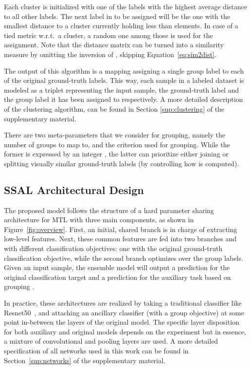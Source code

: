 \documentclass[10pt,twocolumn,letterpaper]{article}
\begin{document}
Each cluster is initialized with one of the  labels with the highest average distance to all other labels.
The next label in  to be assigned will be the one with the smallest distance to a cluster currently holding less than  elements.
In case of a tied metric w.r.t.~a cluster, a random one among those is used for the assignment.
Note that the distance matrix  can be turned into a similarity measure by omitting the inversion of  \ie, skipping Equation~\ref{eq:sim2dist}.

The output of this algorithm is a mapping  assigning a single group label to each of the original ground-truth labels.
This way, each sample in a labeled dataset is modeled as a triplet  representing the input sample, the ground-truth label and the group label it has been assigned to respectively.
A more detailed description of the clustering algorithm, can be found in Section \ref{sup:clustering} of the supplementary material.

There are two meta-parameters that we consider for grouping, namely the number of groups to map to, and the criterion used for grouping.
While the former is expressed by an integer , the latter can prioritize either joining or splitting visually similar ground-truth labels (by controlling how  is computed).


\subsection{SSAL Architectural Design}
The proposed model follows the structure of a hard parameter sharing architecture for MTL with three main components, as shown in Figure~\ref{fig:overview}.
First, an initial, shared branch  is in charge of extracting low-level features.
Next, these common features are fed into two branches  and  with different classification objectives: one with the original ground-truth classification objective, while the second branch optimizes over the group labels.
Given an input sample, the ensemble model will output a prediction for the original classification target  and a prediction for the auxiliary task based on grouping .

In practice, these architectures are realized by taking a traditional classifier like Resnet50~\cite{he2016deep}, and attaching an ancillary classifier (with a group objective) at some point in-between the layers of the original model.
The specific layer disposition for both auxiliary and original models depends on the experiment but in essence, a mixture of convolutional and pooling layers are used.
A more detailed specification of all networks used in this work can be found in Section~\ref{sup:networks} of the supplementary material.
\end{document}
